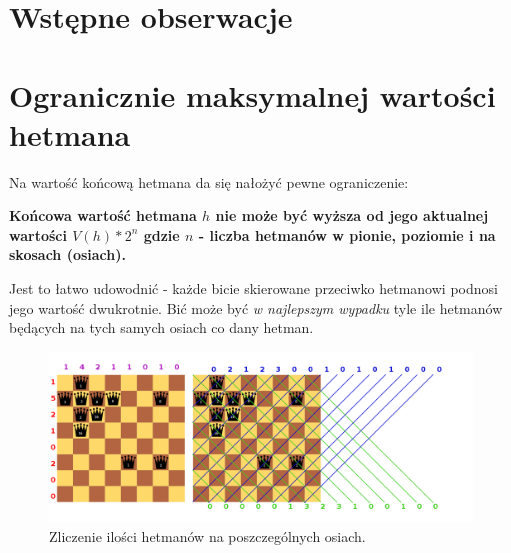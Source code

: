 \documentclass{article}
\begin{document}
\section{Wstępne obserwacje}

\section{Ogranicznie maksymalnej wartości hetmana}

Na wartość końcową hetmana da się nałożyć pewne ograniczenie:

\textbf{Końcowa wartość hetmana $h$ nie może być wyższa od jego aktualnej wartości $V(h) * 2^n$ gdzie $n$ - liczba hetmanów w pionie, poziomie i na skosach (osiach).}

Jest to łatwo udowodnić - każde bicie skierowane przeciwko hetmanowi podnosi jego wartość dwukrotnie. Bić może być \textit{w najlepszym wypadku} tyle ile hetmanów będących na tych samych osiach co dany hetman.

\begin{figure}[!ht]
  \centering
      \includegraphics[scale=0.3]{obs1.png}
  \caption{Zliczenie ilości hetmanów na poszczególnych osiach.}
\end{figure}

\clearpage 
\end{document}
